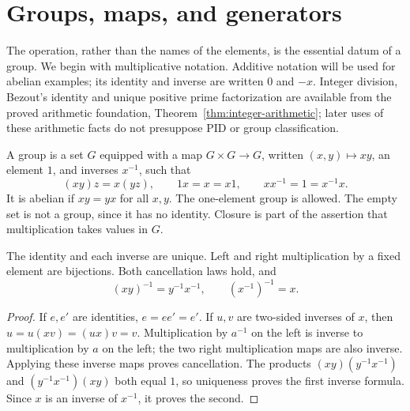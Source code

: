 \chapter{Groups, maps, and generators}\label{chap:M07.01}

The operation, rather than the names of the elements, is the essential datum of a group. We begin with multiplicative notation. Additive notation will be used for abelian examples; its identity and inverse are written $0$ and $-x$. Integer division, Bezout's identity and unique positive prime factorization are available from the proved arithmetic foundation, Theorem~\ref{thm:integer-arithmetic}; later uses of these arithmetic facts do not presuppose PID or group classification.

\begin{definition}
A group is a set $G$ equipped with a map $G\times G\to G$, written $(x,y)\mapsto xy$, an element $1$, and inverses $x^{-1}$, such that
\[
 (xy)z=x(yz),\qquad 1x=x=x1,\qquad xx^{-1}=1=x^{-1}x.
\]
It is abelian if $xy=yx$ for all $x,y$. The one-element group is allowed. The empty set is not a group, since it has no identity. Closure is part of the assertion that multiplication takes values in $G$.
\end{definition}

\begin{proposition}\label{prop:group-basic-laws}
The identity and each inverse are unique. Left and right multiplication by a fixed element are bijections. Both cancellation laws hold, and
\[
 (xy)^{-1}=y^{-1}x^{-1},\qquad (x^{-1})^{-1}=x.
\]
\end{proposition}
\begin{proof}
If $e,e'$ are identities, $e=ee'=e'$. If $u,v$ are two-sided inverses of $x$, then $u=u(xv)=(ux)v=v$. Multiplication by $a^{-1}$ on the left is inverse to multiplication by $a$ on the left; the two right multiplication maps are also inverse. Applying these inverse maps proves cancellation. The products $(xy)(y^{-1}x^{-1})$ and $(y^{-1}x^{-1})(xy)$ both equal $1$, so uniqueness proves the first inverse formula. Since $x$ is an inverse of $x^{-1}$, it proves the second.
\end{proof}

